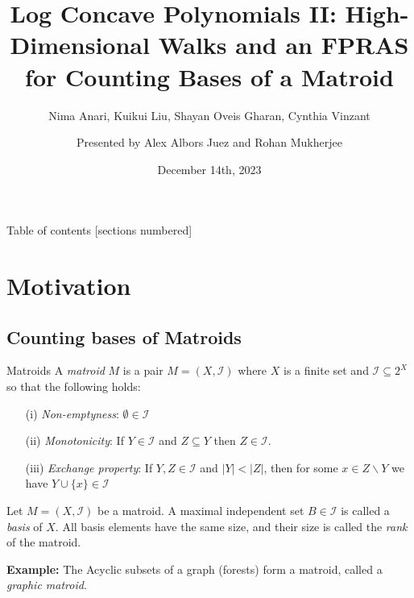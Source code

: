 \documentclass[10pt]{beamer}
\title{Log Concave Polynomials II: High-Dimensional Walks and
an FPRAS for Counting Bases of a Matroid}
\subtitle{Nima Anari, Kuikui Liu, Shayan Oveis Gharan, Cynthia Vinzant}
\date{December 14th, 2023}
\author{Presented by Alex Albors Juez and Rohan Mukherjee}
\institute{CSE 521, University of Washington}
\begin{document}
\maketitle

\begin{frame}{Table of contents}
    [sections numbered]
    \tableofcontents%
\end{frame}

\section{Motivation}
\subsection{Counting bases of Matroids}
\begin{frame}{Matroids}
    A \textit{matroid} $M$ is a pair $M = (X, \mathcal{I})$ where $X$ is a finite set and $\mathcal{I} \subseteq 2^X$ so that the following holds: \begin{enumerate}
        \item[(i)] \textit{Non-emptyness}: $\emptyset \in  \mathcal{I}$
        \item[(ii)] \textit{Monotonicity}:  If  $Y \in \mathcal{I}$ and $Z \subseteq Y$ then $Z \in \mathcal{I}$.
        \item[(iii)] \textit{Exchange property}: If $Y, Z \in \mathcal{I}$ and $|Y| < |Z|$, then for some $x \in Z\backslash Y$ we have $Y \cup \{x\} \in \mathcal{I}$
    \end{enumerate}
    \begin{definition}[basis] Let $M =(X, \mathcal{I})$ be a matroid. A maximal independent set $B \in \mathcal{I}$ is called a \textit{basis} of $X$. All basis elements have the same size, and their size is called the \textit{rank} of the matroid. 
    \end{definition}
    \textbf{Example:} The Acyclic subsets of a graph (forests) form a matroid, called a \textit{graphic matroid}.
\end{frame}
\end{document}
